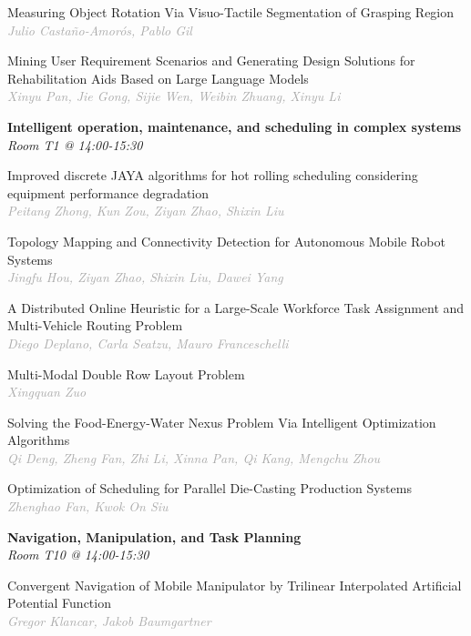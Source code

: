 \begin{multicols*}{2}
\small Measuring Object Rotation Via Visuo-Tactile Segmentation of Grasping Region\\ 
\footnotesize \textcolor{darkgray}{\textit{Julio Castaño-Amorós, Pablo  Gil}}

\small Mining User Requirement Scenarios and Generating Design Solutions for Rehabilitation Aids Based on Large Language Models\\ 
\footnotesize \textcolor{darkgray}{\textit{Xinyu Pan, Jie  Gong, Sijie  Wen, Weibin  Zhuang, Xinyu  Li}}

\normalsize \textbf{Intelligent operation, maintenance, and scheduling in complex systems}\\
\small \textit{Room T1 @ 14:00-15:30}

\small Improved discrete JAYA algorithms for hot rolling scheduling considering equipment performance degradation\\ 
\footnotesize \textcolor{darkgray}{\textit{Peitang Zhong, Kun  Zou, Ziyan  Zhao, Shixin  Liu}}

\small Topology Mapping and Connectivity Detection for Autonomous Mobile Robot Systems\\ 
\footnotesize \textcolor{darkgray}{\textit{Jingfu Hou, Ziyan  Zhao, Shixin  Liu, Dawei  Yang}}

\small A Distributed Online Heuristic for a Large-Scale Workforce Task Assignment and Multi-Vehicle Routing Problem\\ 
\footnotesize \textcolor{darkgray}{\textit{Diego Deplano, Carla  Seatzu, Mauro  Franceschelli}}

\small Multi-Modal Double Row Layout Problem\\ 
\footnotesize \textcolor{darkgray}{\textit{Xingquan Zuo}}

\small Solving the Food-Energy-Water Nexus Problem Via Intelligent Optimization Algorithms\\ 
\footnotesize \textcolor{darkgray}{\textit{Qi Deng, Zheng  Fan, Zhi  Li, Xinna  Pan, Qi  Kang, Mengchu  Zhou}}

\small Optimization of Scheduling for Parallel Die-Casting Production Systems\\ 
\footnotesize \textcolor{darkgray}{\textit{Zhenghao Fan, Kwok On  Siu}}

\normalsize \textbf{Navigation, Manipulation, and Task Planning}\\
\small \textit{Room T10 @ 14:00-15:30}

\small Convergent Navigation of Mobile Manipulator by Trilinear Interpolated Artificial Potential Function\\ 
\footnotesize \textcolor{darkgray}{\textit{Gregor Klancar, Jakob  Baumgartner}}


\end{multicols*}

